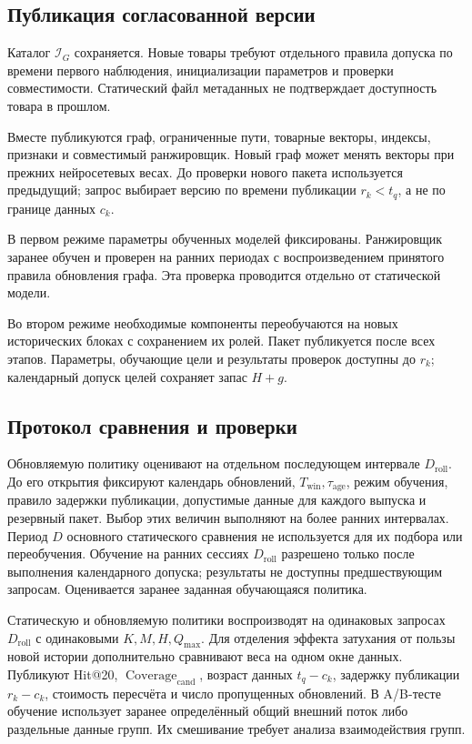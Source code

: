 \documentclass[12pt,a4paper]{article}
\theoremstyle{plainru}
\begin{document}
\subsection{Публикация согласованной версии}\label{sec:freshness-publication}

Каталог $\mathcal I_G$ сохраняется. Новые товары требуют отдельного
правила допуска по времени первого наблюдения, инициализации параметров
и проверки совместимости. Статический файл метаданных не подтверждает
доступность товара в прошлом.

Вместе публикуются граф, ограниченные пути, товарные векторы,
индексы, признаки и совместимый ранжировщик.
Новый граф может менять векторы при прежних нейросетевых весах.
До проверки нового пакета используется предыдущий; запрос выбирает
версию по времени публикации $r_k<t_q$, а не по границе данных $c_k$.

В первом режиме параметры обученных моделей фиксированы.
Ранжировщик заранее обучен и проверен на ранних периодах
с воспроизведением принятого правила обновления графа.
Эта проверка проводится отдельно от статической модели.

Во втором режиме необходимые компоненты переобучаются на новых
исторических блоках с сохранением их ролей. Пакет публикуется после
всех этапов. Параметры, обучающие цели и результаты проверок доступны
до $r_k$; календарный допуск целей сохраняет запас $H+g$.

\subsection{Протокол сравнения и проверки}\label{sec:freshness-evaluation}

Обновляемую политику оценивают на отдельном последующем интервале
$D_{\mathrm{roll}}$. До его открытия фиксируют календарь обновлений,
$T_{\mathrm{win}},\tau_{\mathrm{age}}$, режим обучения, правило задержки
публикации, допустимые данные для каждого выпуска и резервный пакет.
Выбор этих величин выполняют на более ранних интервалах.
Период $D$ основного статического сравнения не используется
для их подбора или переобучения.
Обучение на ранних сессиях $D_{\mathrm{roll}}$ разрешено только после
выполнения календарного допуска; результаты не доступны предшествующим запросам.
Оценивается заранее заданная обучающаяся политика.

Статическую и обновляемую политики воспроизводят на одинаковых
запросах $D_{\mathrm{roll}}$ с одинаковыми $K,M,H,Q_{\max}$.
Для отделения эффекта затухания от пользы новой истории дополнительно
сравнивают веса на одном окне данных.
Публикуют Hit@20, $\operatorname{Coverage}_{\mathrm{cand}}$, возраст данных $t_q-c_k$,
задержку публикации $r_k-c_k$, стоимость пересчёта и число пропущенных
обновлений. В A/B-тесте обучение использует заранее определённый общий внешний поток
либо раздельные данные групп. Их смешивание требует анализа
взаимодействия групп.
\end{document}
